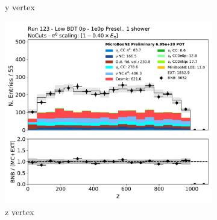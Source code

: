 \begin{figure}[H]
\begin{subfigure}{0.3\textwidth}
    \caption{y vertex}
    \end{subfigure}
    \begin{subfigure}{0.3\textwidth}
    \includegraphics[width=1.0\textwidth]{1e0p/Low_BDT_Sideband/reco_nu_vtx_z.pdf}
    \caption{z vertex}
    \end{subfigure}
    \caption{} 
    \label{fig:HE_1eNp_1}
\end{figure}

